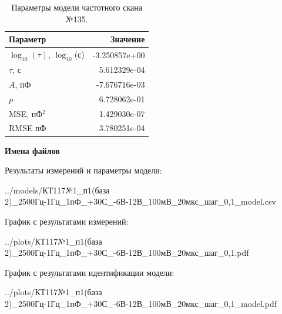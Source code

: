 \begin{table}[!ht]
    \centering
    \caption{Параметры модели частотного скана №135.}
    \begin{tabular}{|l|r|}
        \hline
        Параметр                                       & Значение                  \\ \hline
        $\log_{10}(\tau)$, $\log_{10}$(с)              & -3.250857e+00             \\ \hline
        $\tau$, с                                      & 5.612329e-04              \\ \hline
        $A$, пФ                                        & -7.676716e-03             \\ \hline
        $p$                                            & 6.728062e-01              \\ \hline
        MSE, пФ$^2$                                    & 1.429030e-07              \\ \hline
        RMSE пФ                                        & 3.780251e-04              \\ \hline
    \end{tabular}
    \label{table:frequency_scan_model_135}
\end{table}

\textbf{Имена файлов}

Результаты измерений и параметры модели:

\scriptsize../models/КТ117№1\_п1(база 2)\_2500Гц-1Гц\_1пФ\_+30С\_-6В-12В\_100мВ\_20мкс\_шаг\_0,1\_model.csv
\normalsize

График с результатами измерений:

\scriptsize../plots/КТ117№1\_п1(база 2)\_2500Гц-1Гц\_1пФ\_+30С\_-6В-12В\_100мВ\_20мкс\_шаг\_0,1.pdf
\normalsize

График с результатами идентификации модели:

\scriptsize../plots/КТ117№1\_п1(база 2)\_2500Гц-1Гц\_1пФ\_+30С\_-6В-12В\_100мВ\_20мкс\_шаг\_0,1\_model.pdf
\normalsize

